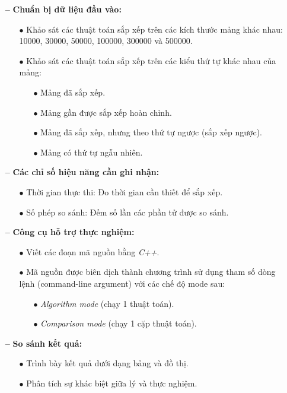 \begin{itemize}
    \item [\textbf{--}] \textbf{Chuẩn bị dữ liệu đầu vào:}
    \begin{itemize}
    \item [$\bullet$] Khảo sát các thuật toán sắp xếp trên các kích thước mảng khác nhau: 10000, 30000, 50000, 100000, 300000 và 500000.
    \item [$\bullet$] Khảo sát các thuật toán sắp xếp trên các kiểu thứ tự khác nhau của mảng:
        \begin{itemize}
            \item [$\bullet$] Mảng đã sắp xếp.
            \item [$\bullet$] Mảng gần được sắp xếp hoàn chỉnh.
            \item [$\bullet$] Mảng đã sắp xếp, nhưng theo thứ tự ngược (sắp xếp ngược).
            \item [$\bullet$] Mảng có thứ tự ngẫu nhiên.
        \end{itemize}
    \end{itemize}
    \item [\textbf{--}] \textbf{Các chỉ số hiệu năng cần ghi nhận:}
    \begin{itemize}
        \item [$\bullet$] Thời gian thực thi: Đo thời gian cần thiết để sắp xếp.
        \item [$\bullet$] Số phép so sánh: Đếm số lần các phần tử được so sánh.
    \end{itemize}
    \item [\textbf{--}] \textbf{Công cụ hỗ trợ thực nghiệm:}
    \begin{itemize}
        \item [$\bullet$]Viết các đoạn mã nguồn bằng \textit{C++}.
        \item [$\bullet$]Mã nguồn được biên dịch thành chương trình sử dụng tham số dòng lệnh (command-line argument) với các chế độ mode sau:
        \begin{itemize}
            \item [$\bullet$] \textit{Algorithm mode} (chạy 1 thuật toán).
            \item [$\bullet$] \textit{Comparison mode} (chạy 1 cặp thuật toán).
        \end{itemize}
    \end{itemize}
    \item [\textbf{--}]\textbf{So sánh kết quả:}
    \begin{itemize}
        \item [$\bullet$]Trình bày kết quả dưới dạng bảng và đồ thị.
        \item [$\bullet$]Phân tích sự khác biệt giữa lý và thực nghiệm.
    \end{itemize}
\end{itemize}

